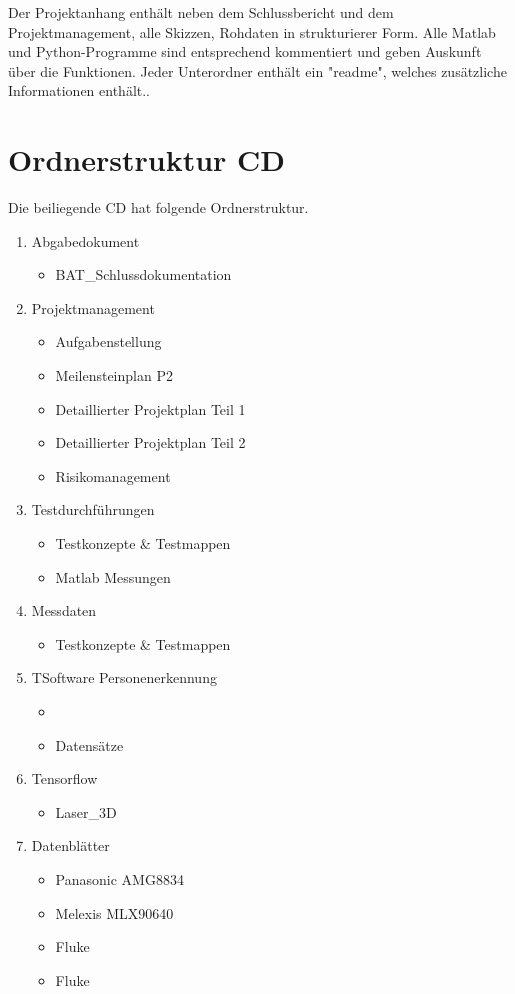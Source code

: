 Der Projektanhang enthält neben dem Schlussbericht und dem Projektmanagement, alle Skizzen, Rohdaten in strukturierer Form. Alle Matlab und Python-Programme sind entsprechend kommentiert und geben Auskunft über die Funktionen. Jeder Unterordner enthält ein "readme", welches zusätzliche Informationen enthält..
\section{Ordnerstruktur CD}


Die beiliegende CD hat folgende Ordnerstruktur.

\begin{enumerate}
	\item Abgabedokument
	\begin{itemize}
		\item BAT\_Schlussdokumentation
	\end{itemize}
	\item Projektmanagement
	\begin{itemize}
		\item Aufgabenstellung
		\item Meilensteinplan P2
		\item Detaillierter Projektplan Teil 1
		\item Detaillierter Projektplan Teil 2
		\item Risikomanagement
	\end{itemize}
	\item Testdurchführungen
	\begin{itemize}
		\item Testkonzepte \& Testmappen
		\item Matlab Messungen
	\end{itemize}
	\item Messdaten
	\begin{itemize}
	\item Testkonzepte \& Testmappen
	\end{itemize}
	\item TSoftware Personenerkennung
	\begin{itemize}
		\item 
		\item Datensätze
	\end{itemize}
	\item Tensorflow
	\begin{itemize}
		\item Laser\_3D
	\end{itemize}
	\item Datenblätter
	\begin{itemize}
		\item Panasonic AMG8834
		\item Melexis MLX90640
		\item Fluke
		\item Fluke 
	\end{itemize}
\end{enumerate}

\newpage




